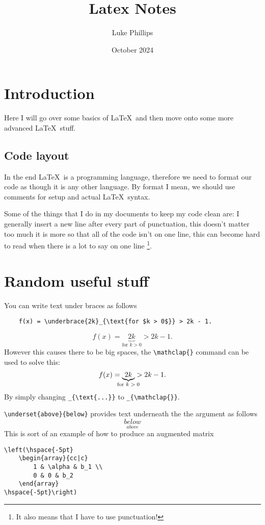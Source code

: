 \documentclass[10pt, a4paper]{article}
\title{Latex Notes}
\author{Luke Phillips}
\date{October 2024}
\begin{document}
\maketitle

\newpage

\section{Introduction}
Here I will go over some basics of \LaTeX\ and then move onto some more advanced \LaTeX\ stuff.

\subsection{Code layout}
In the end \LaTeX\ is a programming language,
therefore we need to format our code as though it is any other language.
By format I mean,
we should use comments for setup and actual \LaTeX\ syntax.

Some of the things that I do in my documents to keep my code clean are:
I generally insert a new line after every part of punctuation,
this doesn't matter too much it is more so that all of the code isn't on one line,
this can become hard to read when there is a lot to say on one line
\footnote{It also means that I have to use punctuation!}.

\newpage

\section{Random useful stuff}

You can write text under braces as follows
\begin{verbatim}
    f(x) = \underbrace{2k}_{\text{for $k > 0$}} > 2k - 1.
\end{verbatim}
\[
f(x) = \underbrace{2k}_{\text{for $k > 0$}} > 2k - 1.
\]
However this causes there to be big spaces,
the \verb|\mathclap{}| command can be used to solve this:
\[
f(x) = \underbrace{2k}_{\mathclap{\text{for $k > 0$}}} > 2k - 1.
\]
By simply changing \verb|_{\text{...}}| to \verb|_{\mathclap{}}|.

\verb|\underset{above}{below}| provides text underneath the the argument as follows
\[
\underset{above}{below}
\]
This is sort of an example of how to produce an augmented matrix
\begin{verbatim}
\left(\hspace{-5pt}
    \begin{array}{cc|c}
        1 & \alpha & b_1 \\
        0 & 0 & b_2
    \end{array}
\hspace{-5pt}\right)
\end{verbatim}
\end{document}
